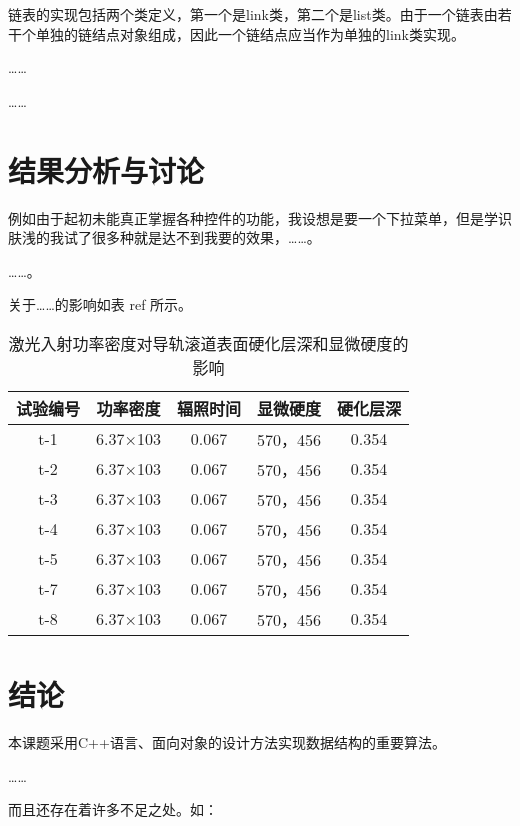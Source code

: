 \documentclass{upcthesis}
\begin{document}
链表的实现包括两个类定义，第一个是link类，第二个是list类。由于一个链表由若干个单独的链结点对象组成，因此一个链结点应当作为单独的link类实现。

……

……

\section{结果分析与讨论}
例如由于起初未能真正掌握各种控件的功能，我设想是要一个下拉菜单，但是学识肤浅的我试了很多种就是达不到我要的效果，……。

……。

关于……的影响如表 {ref} 所示。

\begin{table}[htbp]
	\centering
	\caption{激光入射功率密度对导轨滚道表面硬化层深和显微硬度的影响}
	\begin{tabular}{ccccc}
		\toprule
		试验编号 	& 功率密度 & 辐照时间 & 显微硬度 	& 硬化层深 \\ \midrule
		t-1			&	6.37×103&	0.067	&	570，456	& 	0.354\\
		t-2			&	6.37×103&	0.067 &	570，456 &	0.354\\
		t-3			&	6.37×103&	0.067 &	570，456 &	0.354\\
		t-4			&	6.37×103&	0.067 &	570，456 &	0.354\\
		t-5			&	6.37×103&	0.067 &	570，456 &	0.354\\
		t-7			&	6.37×103&	0.067 &	570，456 &	0.354\\
		t-8			&	6.37×103&	0.067 &	570，456 &	0.354\\ \bottomrule
	\end{tabular}
	\label{tab:tab1}
\end{table} 

\section{结论}
	本课题采用C++语言、面向对象的设计方法实现数据结构的重要算法。
	
	……

	而且还存在着许多不足之处。如：

	
\end{document}
